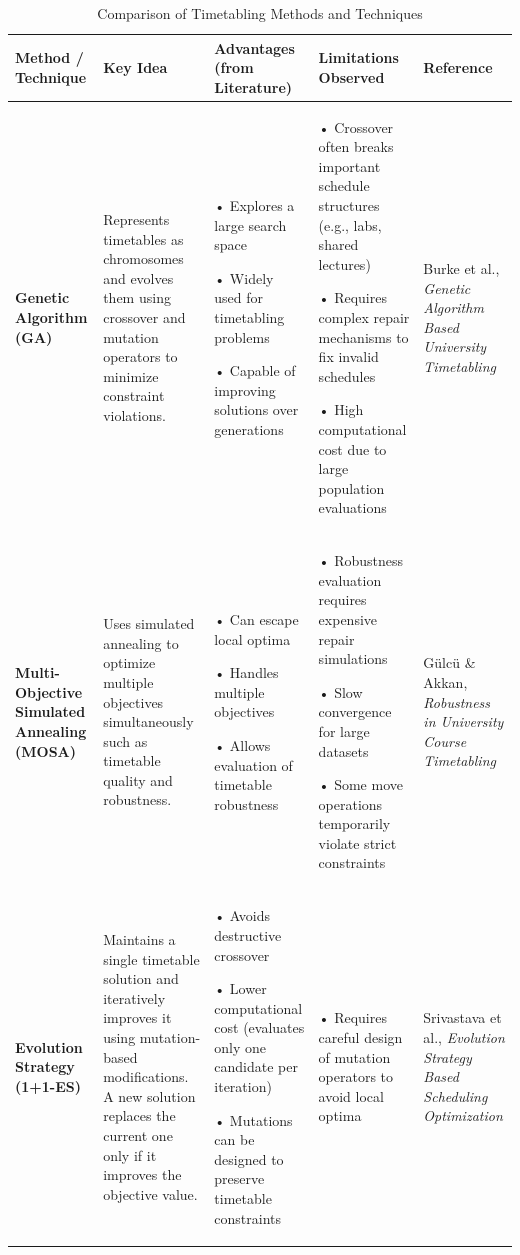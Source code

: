\documentclass{article}
\begin{document}
\begin{table}[htbp]
    \centering
    \caption{Comparison of Timetabling Methods and Techniques}
    \vspace{2mm}
    \small 
    \begin{tabularx}{\textwidth}{|>{\RaggedRight\arraybackslash}p{2.5cm}|>{\RaggedRight\arraybackslash}X|>{\RaggedRight\arraybackslash}X|>{\RaggedRight\arraybackslash}X|>{\RaggedRight\arraybackslash}p{2.5cm}|}
        \hline
        \textbf{Method / Technique} & \textbf{Key Idea} & \textbf{Advantages (from Literature)} & \textbf{Limitations Observed} & \textbf{Reference} \\ \hline
        
        \textbf{Genetic Algorithm (GA)} & 
        Represents timetables as chromosomes and evolves them using crossover and mutation operators to minimize constraint violations. & 
        • Explores a large search space \par • Widely used for timetabling problems \par • Capable of improving solutions over generations & 
        • Crossover often breaks important schedule structures (e.g., labs, shared lectures) \par • Requires complex repair mechanisms to fix invalid schedules \par • High computational cost due to large population evaluations & 
        Burke et al., \textit{Genetic Algorithm Based University Timetabling} \\ \hline
        
        \textbf{Multi-Objective Simulated Annealing (MOSA)} & 
        Uses simulated annealing to optimize multiple objectives simultaneously such as timetable quality and robustness. & 
        • Can escape local optima \par • Handles multiple objectives \par • Allows evaluation of timetable robustness & 
        • Robustness evaluation requires expensive repair simulations \par • Slow convergence for large datasets \par • Some move operations temporarily violate strict constraints & 
        Gülcü \& Akkan, \textit{Robustness in University Course Timetabling} \\ \hline
        
        \textbf{Evolution Strategy (1+1-ES)} & 
        Maintains a single timetable solution and iteratively improves it using mutation-based modifications. A new solution replaces the current one only if it improves the objective value. & 
        • Avoids destructive crossover \par • Lower computational cost (evaluates only one candidate per iteration) \par • Mutations can be designed to preserve timetable constraints & 
        • Requires careful design of mutation operators to avoid local optima & 
        Srivastava et al., \textit{Evolution Strategy Based Scheduling Optimization} \\ \hline
        

\end{tabularx}
\end{table}
\end{document}
